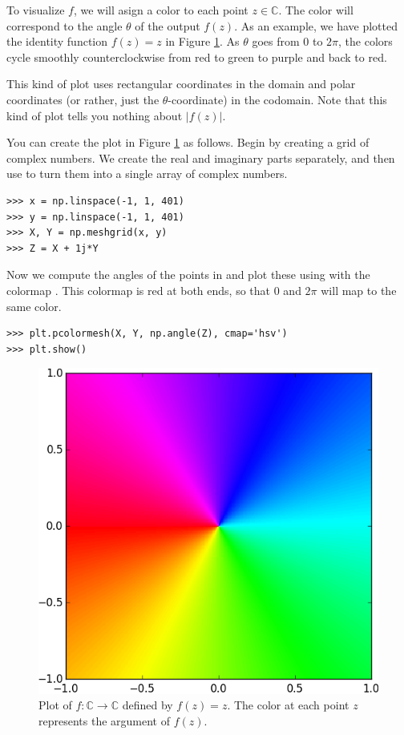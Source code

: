 To visualize $f$, we will asign a color to each point $z \in \mathbb{C}$. 
The color will correspond to the angle $\theta$ of the output $f(z)$. 
As an example, we have plotted the identity function $f(z)=z$ in Figure \ref{fig:identity}.
As $\theta$ goes from 0 to $2\pi$, the colors cycle smoothly counterclockwise from red to green to purple and back to red.

This kind of plot uses rectangular coordinates in the domain and polar coordinates (or rather, just the $\theta$-coordinate) in the codomain.
Note that this kind of plot tells you nothing about $|f(z)|$.

You can create the plot in Figure \ref{fig:identity} as follows.
Begin by creating a grid of complex numbers.
We create the real and imaginary parts separately, and then use  to turn them into a single array of complex numbers.
\begin{lstlisting}
>>> x = np.linspace(-1, 1, 401)
>>> y = np.linspace(-1, 1, 401)
>>> X, Y = np.meshgrid(x, y)
>>> Z = X + 1j*Y
\end{lstlisting}

Now we compute the angles of the points in  and plot these using  with the colormap . 
This colormap is red at both ends, so that $0$ and $2 \pi$ will map to the same color.

\begin{lstlisting}
>>> plt.pcolormesh(X, Y, np.angle(Z), cmap='hsv')
>>> plt.show()
\end{lstlisting}


\begin{figure}
\includegraphics[width=.7\textwidth]{Identity.png}
\caption{Plot of $f: \mathbb{C} \rightarrow \mathbb{C}$ defined by $f(z)=z$. 
The color at each point $z$ represents the argument of $f(z)$.}
\label{fig:identity}
\end{figure}





